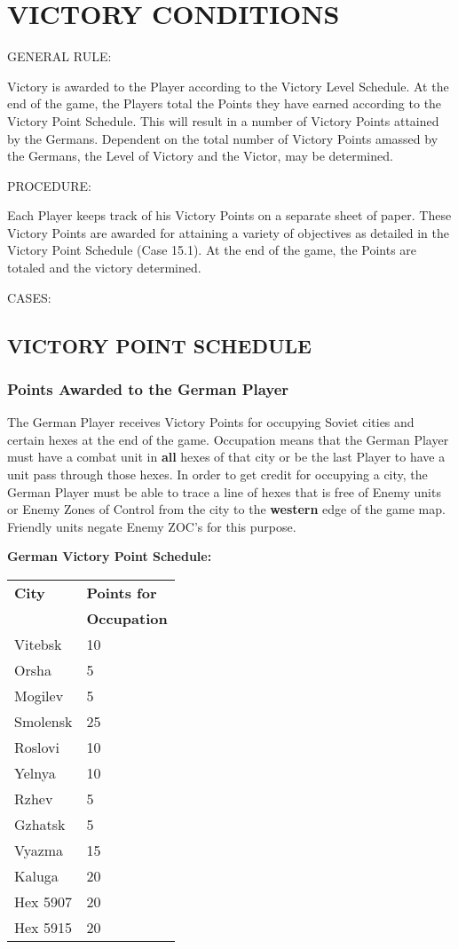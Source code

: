 \section{VICTORY CONDITIONS}

GENERAL RULE:

Victory is awarded to the Player according to the Victory Level Schedule. At the end of the game, the Players total the Points they have earned according to the Victory Point Schedule. This will result in a number of Victory Points attained by the Germans. Dependent on the total number of Victory Points amassed by the Germans, the Level of Victory and the Victor, may be determined.

PROCEDURE:

Each Player keeps track of his Victory Points on a separate sheet of paper. These Victory Points are awarded for attaining a variety of objectives as detailed in the Victory Point Schedule (Case 15.1). At the end of the game, the Points are totaled and the victory determined.

CASES:

\subsection{VICTORY POINT SCHEDULE}

\subsubsection{Points Awarded to the German Player}

The German Player receives Victory Points for occupying Soviet cities and certain hexes at the end of the game. Occupation means that the German Player must have a combat unit in \textbf{all} hexes of that city or be the last Player to have a unit pass through those hexes. In order to get credit for occupying a city, the German Player must be able to trace a line of hexes that is free of Enemy units or Enemy Zones of Control from the city to the \textbf{western} edge of the game map. Friendly units negate Enemy ZOC's for this purpose.

\textbf{German Victory Point Schedule:}

\begin{tabular}{l@{\hskip 1.2in}l}
  \textbf{City} & \textbf{Points for}\\
  & \textbf{Occupation}\\
  Vitebsk & 10\\
  Orsha & 5\\
  Mogilev & 5\\
  Smolensk & 25\\
  Roslovi & 10\\
  Yelnya & 10\\
  Rzhev & 5\\
  Gzhatsk & 5\\
  Vyazma & 15\\
  Kaluga & 20\\
  Hex 5907 & 20\\
  Hex 5915 & 20
\end{tabular}

